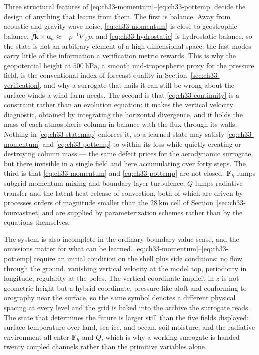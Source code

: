 Three structural features of \eqref{eq:ch33-momentum}--\eqref{eq:ch33-pottemp} decide the
design of anything that learns from them. The first is balance. Away from acoustic and
gravity-wave noise, \eqref{eq:ch33-momentum} is close to geostrophic balance,
$f\hat{\mathbf{k}}\times\mathbf{u}_h \approx -\rho^{-1}\nabla_h p$, and
\eqref{eq:ch33-hydrostatic} is hydrostatic balance, so the state is not an arbitrary
element of a high-dimensional space: the fast modes carry little of the information a
verification metric rewards. This is why the geopotential height at $500\ \mathrm{hPa}$,
a smooth mid-tropospheric proxy for the pressure field, is the conventional index of
forecast quality in Section~\ref{sec:ch33-verification}, and why a surrogate that nails it
can still be wrong about the surface winds a wind farm needs. The second is that
\eqref{eq:ch33-continuity} is a constraint rather than an evolution equation: it makes the
vertical velocity diagnostic, obtained by integrating the horizontal divergence, and it
holds the mass of each atmospheric column in balance with the flux through its walls.
Nothing in \eqref{eq:ch33-statemap} enforces it, so a learned state may satisfy
\eqref{eq:ch33-momentum} and \eqref{eq:ch33-pottemp} to within its loss while quietly
creating or destroying column mass --- the same defect
 prices for the aerodynamic
surrogate, but there invisible in a single field and here accumulating over forty steps.
The third is that \eqref{eq:ch33-momentum} and \eqref{eq:ch33-pottemp} are not closed.
$\mathbf{F}_h$ lumps subgrid momentum mixing and boundary-layer turbulence; $Q$ lumps
radiative transfer and the latent heat release of convection, both of which are driven by
processes orders of magnitude smaller than the $28\ \mathrm{km}$ cell of
Section~\ref{sec:ch33-fourcastnet} and are supplied by parameterization schemes rather than
by the equations themselves.

The system is also incomplete in the ordinary boundary-value sense, and the omissions
matter for what can be learned. \eqref{eq:ch33-momentum}--\eqref{eq:ch33-pottemp} require an
initial condition on the shell plus side conditions: no flow through the ground, vanishing
vertical velocity at the model top, periodicity in longitude, regularity at the poles. The
vertical coordinate implicit in $z$ is not geometric height but a hybrid coordinate,
pressure-like aloft and conforming to orography near the surface, so the same symbol denotes
a different physical spacing at every level and the grid is baked into the archive the
surrogate reads. The state that determines the future is larger still than the five fields
displayed: surface temperature over land, sea ice, and ocean, soil moisture, and the
radiative environment all enter $\mathbf{F}_h$ and $Q$, which is why a working surrogate is
handed twenty coupled channels rather than the primitive variables alone.

